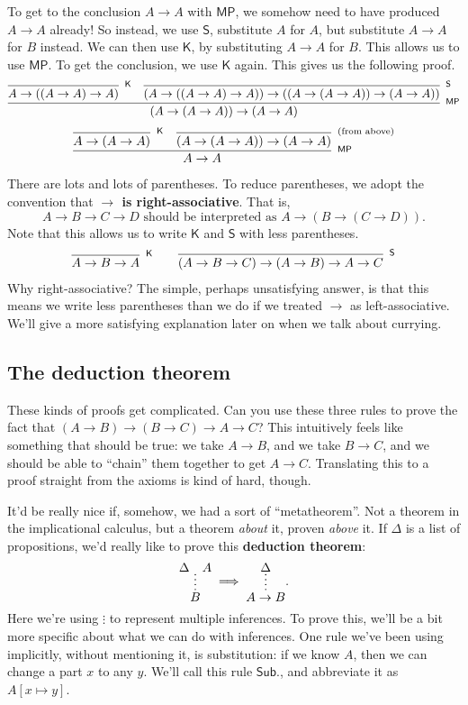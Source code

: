 \documentclass[11pt,paper=letter]{scrartcl}
\renewcommand{\sf}{\mathsf}
\newcommand{\vc}[1]{\vcenter{\hbox{#1}}}
\begin{document}
To get to the conclusion $A \to A$ with $\sf{MP}$, we somehow need to have produced $A \to A$ already! So instead, we use $\sf{S}$, substitute $A$ for $A$, but substitute $A \to A$ for $B$ instead. We can then use $\sf{K}$, by substituting $A \to A$ for $B$. This allows us to use $\sf{MP}$. To get the conclusion, we use $\sf{K}$ again. This gives us the following proof.
\begin{align*}
\infer[^\sf{MP}]
{(A \to (A \to A)) \to (A \to A)}
{
  \infer[^\sf{K}]
  {A \to ((A \to A) \to A)}
  {}
  &
  \infer[^\sf{S}]
  {(A \to ((A \to A) \to A)) \to ((A \to (A \to A)) \to (A \to A))}
  {}
}
\end{align*}
\begin{align*}
\infer[^\sf{MP}]
{A \to A}
{
  \infer[^\sf{K}]
  {A \to (A \to A)}
  {}
  &
  \infer[^\text{(from above)}]
  {(A \to (A \to A)) \to (A \to A)}
  {}
}
\end{align*}
There are lots and lots of parentheses. To reduce parentheses, we adopt the convention that \textbf{$\mathbf{\to}$ is right-associative}. That is, \[
  A \to B \to C \to D \text{ should be interpreted as } A \to (B \to (C \to D)).
\]
Note that this allows us to write $\sf{K}$ and $\sf{S}$ with less parentheses.
\begin{align*}
\infer[^\sf{K}]
{A \to B \to A}
{}
\qquad
\infer[^\sf{S}]
{(A \to B \to C) \to (A \to B) \to A \to C}
{}
\end{align*}
Why right-associative? The simple, perhaps unsatisfying answer, is that this means we write less parentheses than we do if we treated $\to$ as left-associative. We'll give a more satisfying explanation later on when we talk about currying.

\subsection{The deduction theorem}

These kinds of proofs get complicated. Can you use these three rules to prove the fact that $(A \to B) \to (B \to C) \to A \to C$? This intuitively feels like something that should be true: we take $A \to B$, and we take $B \to C$, and we should be able to ``chain'' them together to get $A \to C$. Translating this to a proof straight from the axioms is kind of hard, though.

It'd be really nice if, somehow, we had a sort of ``metatheorem''. Not a theorem in the implicational calculus, but a theorem \emph{about} it, proven \emph{above} it. If $\Delta$ is a list of propositions, we'd really like to prove this \textbf{deduction theorem}:
\begin{align*}
\vc{\infer*
{B}
{\Delta & A}}
\implies
\vc{\infer*
{A \to B}
{\Delta}}.
\end{align*}
Here we're using $\vdots$ to represent multiple inferences. To prove this, we'll be a bit more specific about what we can do with inferences. One rule we've been using implicitly, without mentioning it, is substitution: if we know $A$, then we can change a part $x$ to any $y$. We'll call this rule $\sf{Sub.}$, and abbreviate it as $A[x \mapsto y]$. 
\end{document}

